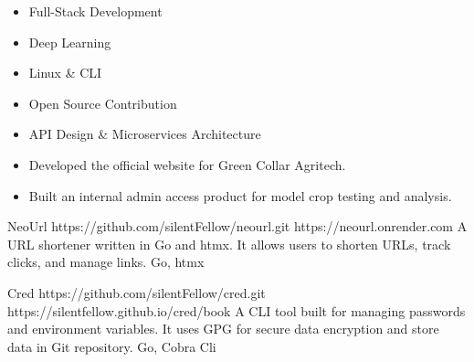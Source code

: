 \documentclass[10pt,a4paper,ragged2e,withhyper]{altacv}
\begin{document}
\begin{paracol}{2}

\begin{itemize}
    \item Full-Stack Development
    \item Deep Learning
    \item Linux \& CLI
    \item Open Source Contribution
    \item API Design & Microservices Architecture
\end{itemize}



\begin{itemize}
\item Developed the official website for Green Collar Agritech.
\item Built an internal admin access product for model crop testing and analysis.
\end{itemize}


\cvproject
  {NeoUrl}
  {https://github.com/silentFellow/neourl.git}
  {https://neourl.onrender.com}
  {}
  {A URL shortener written in Go and htmx. It allows users to shorten URLs, track clicks, and manage links.}
  {Go, htmx}

\divider

\cvproject
  {Cred}
  {https://github.com/silentFellow/cred.git}
  {https://silentfellow.github.io/cred/book}
  {}
  {A CLI tool built for managing passwords and environment variables. It uses GPG for secure data encryption and store data in Git repository.}
  {Go, Cobra Cli}


\end{paracol}
\end{document}
